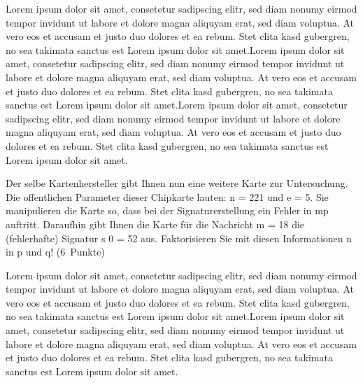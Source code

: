 \documentclass[addpoints,a4paper,ngerman,10pt,answers]{exam}
\begin{document}
\begin{questions}
\ifprintanswers
\begin{minipage}{0.7\textwidth}
\begin{solution}
\parbox[t][][t]{0.8\textwidth}{Lorem ipsum dolor sit amet, consetetur sadipscing elitr, sed diam nonumy eirmod tempor invidunt ut labore et dolore magna aliquyam erat, sed diam voluptua. At vero eos et accusam et justo duo dolores et ea rebum. Stet clita kasd gubergren, no sea takimata sanctus est Lorem ipsum dolor sit amet.Lorem ipsum dolor sit amet, consetetur sadipscing elitr, sed diam nonumy eirmod tempor invidunt ut labore et dolore magna aliquyam erat, sed diam voluptua. At vero eos et accusam et justo duo dolores et ea rebum. Stet clita kasd gubergren, no sea takimata sanctus est Lorem ipsum dolor sit amet.Lorem ipsum dolor sit amet, consetetur sadipscing elitr, sed diam nonumy eirmod tempor invidunt ut labore et dolore magna aliquyam erat, sed diam voluptua. At vero eos et accusam et justo duo dolores et ea rebum. Stet clita kasd gubergren, no sea takimata sanctus est Lorem ipsum dolor sit amet.}
\end{solution}
\end{minipage}
\else
{}
\fi
\vspace{1cm}
\question[6] \parbox[t][][t]{0.68\textwidth}{Der selbe Kartenhersteller gibt Ihnen nun eine weitere Karte zur Untersuchung.
Die offentlichen Parameter dieser Chipkarte lauten: n = 221 und e = 5. Sie
manipulieren die Karte so, dass bei der Signaturerstellung ein Fehler in mp auftritt.
Daraufhin gibt Ihnen die Karte für die Nachricht m = 18 die (fehlerhafte)
Signatur s
0 = 52 aus. Faktorisieren Sie mit diesen Informationen n in p und q!
\linebreak(6\ Punkte)}

\ifprintanswers
\begin{minipage}{0.7\textwidth}
\begin{solution}
\parbox[t][][t]{0.8\textwidth}{Lorem ipsum dolor sit amet, consetetur sadipscing elitr, sed diam nonumy eirmod tempor invidunt ut labore et dolore magna aliquyam erat, sed diam voluptua. At vero eos et accusam et justo duo dolores et ea rebum. Stet clita kasd gubergren, no sea takimata sanctus est Lorem ipsum dolor sit amet.Lorem ipsum dolor sit amet, consetetur sadipscing elitr, sed diam nonumy eirmod tempor invidunt ut labore et dolore magna aliquyam erat, sed diam voluptua. At vero eos et accusam et justo duo dolores et ea rebum. Stet clita kasd gubergren, no sea takimata sanctus est Lorem ipsum dolor sit amet.}
\end{solution}
\end{minipage}
\else
{}
\fi
\vspace{1cm}



\end{questions}
\end{document}
